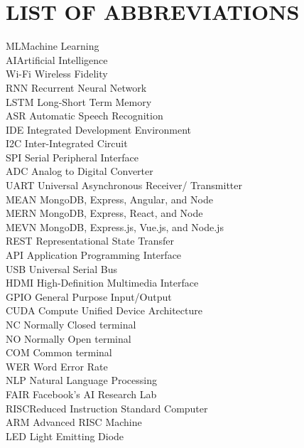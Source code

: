 \chapter*{LIST OF ABBREVIATIONS}
ML\tabto{6em}Machine Learning\\
AI\tabto{6em}Artificial Intelligence\\
Wi-Fi\tabto{6em} Wireless Fidelity\\
RNN\tabto{6em} Recurrent Neural Network\\
LSTM\tabto{6em} Long-Short Term Memory\\
ASR\tabto{6em} Automatic Speech Recognition\\
IDE\tabto{6em} Integrated Development Environment\\
I2C\tabto{6em} Inter-Integrated Circuit\\
SPI\tabto{6em} Serial Peripheral Interface\\
ADC\tabto{6em} Analog to Digital Converter\\
UART\tabto{6em} Universal Asynchronous Receiver/ Transmitter\\
MEAN\tabto{6em} MongoDB, Express, Angular, and Node\\
MERN\tabto{6em} MongoDB, Express, React, and Node\\
MEVN\tabto{6em} MongoDB, Express.js, Vue.js, and Node.js\\
REST\tabto{6em} Representational State Transfer\\
API\tabto{6em} Application Programming Interface \\
USB\tabto{6em} Universal Serial Bus\\
HDMI\tabto{6em} High-Definition Multimedia Interface\\
GPIO\tabto{6em} General Purpose Input/Output\\
CUDA\tabto{6em} Compute Unified Device Architecture\\
NC\tabto{6em} Normally Closed terminal\\
NO\tabto{6em} Normally Open terminal\\
COM\tabto{6em} Common terminal\\
WER\tabto{6em} Word Error Rate \\
NLP\tabto{6em} Natural Language Processing \\
FAIR\tabto{6em} Facebook's AI Research Lab\\
RISC\tabto{6em}Reduced Instruction Standard Computer \\
ARM\tabto{6em} Advanced RISC Machine \\
LED\tabto{6em} Light Emitting Diode \\